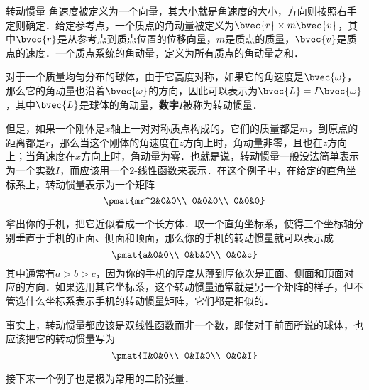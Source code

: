 \begin{example}{转动惯量}
角速度被定义为一个向量，其大小就是角速度的大小，方向则按照右手定则确定．给定参考点，一个质点的角动量被定义为$\bvec{r}\times m\bvec{v}$，其中$\bvec{r}$是从参考点到质点位置的位移向量，$m$是质点的质量，$\bvec{v}$是质点的速度．一个质点系统的角动量，定义为所有质点的角动量之和．

对于一个质量均匀分布的球体，由于它高度对称，如果它的角速度是$\bvec{\omega}$，那么它的角动量也沿着$\bvec{\omega}$的方向，因此可以表示为$\bvec{L}=I\bvec{\omega}$，其中$\bvec{L}$是球体的角动量，\textbf{数字}$I$被称为转动惯量．

但是，如果一个刚体是$x$轴上一对对称质点构成的，它们的质量都是$m$，到原点的距离都是$r$，那么当这个刚体的角速度在$z$方向上时，角动量非零，且也在$z$方向上；当角速度在$x$方向上时，角动量为零．也就是说，转动惯量一般没法简单表示为一个实数$I$，而应该用一个$2$-线性函数来表示．在这个例子中，在给定的直角坐标系上，转动惯量表示为一个矩阵
\begin{equation}
\pmat{mr^2&0&0\\ 0&0&0\\ 0&0&0}
\end{equation}

拿出你的手机，把它近似看成一个长方体．取一个直角坐标系，使得三个坐标轴分别垂直于手机的正面、侧面和顶面，那么你的手机的转动惯量就可以表示成
\begin{equation}
\pmat{a&0&0\\ 0&b&0\\ 0&0&c}
\end{equation}
其中通常有$a>b>c$，因为你的手机的厚度从薄到厚依次是正面、侧面和顶面对应的方向．如果选用其它坐标系，这个转动惯量通常就是另一个矩阵的样子，但不管选什么坐标系表示手机的转动惯量矩阵，它们都是相似的．

事实上，转动惯量都应该是双线性函数而非一个数，即使对于前面所说的球体，也应该把它的转动惯量写为
\begin{equation}
\pmat{I&0&0\\ 0&I&0\\ 0&0&I}
\end{equation}
\end{example}

接下来一个例子也是极为常用的二阶张量．

